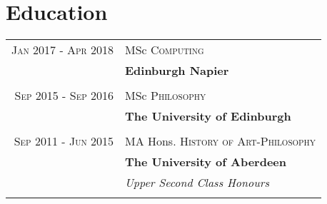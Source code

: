 \documentclass[12pt, a4paper]{article}
\begin{document}
\section{Education}

\begin{tabular}{rl}	
\textsc{Jan} 2017 - \textsc{Apr} 2018 & MSc \textsc{Computing} \\
&\textbf{Edinburgh Napier}\\
\\

\textsc{Sep} 2015 - \textsc{Sep} 2016 & MSc \textsc{Philosophy} \\ 
&\textbf{The University of Edinburgh}\\
\\

\textsc{Sep} 2011 - \textsc{Jun} 2015& MA Hons. \textsc{History of Art}-\textsc{Philosophy}\\ 
&\textbf{The University of Aberdeen}\\ 
&\small\emph{Upper Second Class Honours}\\
\\

\end{tabular}
\end{document}
